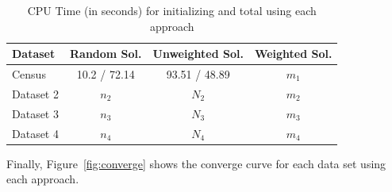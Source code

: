 	\begin{table}[ h ]
		\centering
		\begin{tabular}{ | l | c | c | c | }
			\hline
			Dataset & Random Sol. & Unweighted Sol. & Weighted Sol.\\ \hline
			Census & 10.2 / 72.14 & 93.51 / 48.89 & $m_1$ \\ \hline
			Dataset 2 & $n_2$ & $N_2$ & $m_2$ \\ \hline
			Dataset 3 & $n_3$ & $N_3$ & $m_3$ \\ \hline
			Dataset 4 & $n_4$ & $N_4$ & $m_4$ \\ \hline
		\end{tabular}
		\caption{CPU Time (in seconds) for initializing and total using each approach}
		\label{tab:times}
	\end{table}
	Finally, Figure~\ref{fig:converge} shows the converge curve for each data set using each approach.
